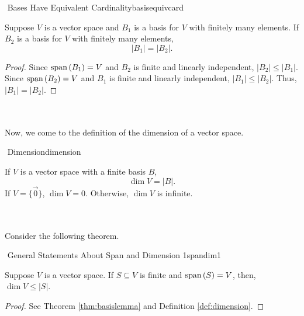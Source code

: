         \begin{theorem}{\Stop\,\,Bases Have Equivalent Cardinality}{basisequivcard}

            Suppose \(V\) is a vector space and \(B_1\) is a basis for \(V\) with finitely many elements. If \(B_2\) is a basis for \(V\) with finitely many elements,
            \begin{equation*}
                |B_1|=|B_2|.
            \end{equation*}
            \begin{proof}
                Since \(\text{span\,}(B_1)=V\) and \(B_2\) is finite and linearly independent, \(|B_2|\leq|B_1|\). Since \(\text{span\,}(B_2)=V\) and \(B_1\) is finite and linearly independent, \(|B_1|\leq|B_2|\). Thus, \(|B_1|=|B_2|\).
            \end{proof}
            
        \end{theorem}
        \vphantom
        \\
        \\
        Now, we come to the definition of the dimension of a vector space.
        \begin{definition}{\Stop\,\,Dimension}{dimension}

            If \(V\) is a vector space with a finite basis \(B\),
            \begin{equation*}
                \dim V = |B|.
            \end{equation*}
            If \(V=\{\vec{0}\}\), \(\dim V=0\). Otherwise, \(\dim V\) is infinite.
            
        \end{definition}
        \vphantom
        \\
        \\
        Consider the following theorem.
        \begin{theorem}{\Stop\,\,General Statements About Span and Dimension 1}{spandim1}
            
            Suppose \(V\) is a vector space. If \(S\subseteq V\) is finite and \(\text{span\,}(S)=V\), then, \(\dim V\leq|S|\).
            \begin{proof}
                See Theorem \ref{thm:basislemma} and Definition \ref{def:dimension}.
            \end{proof}

        \end{theorem}
